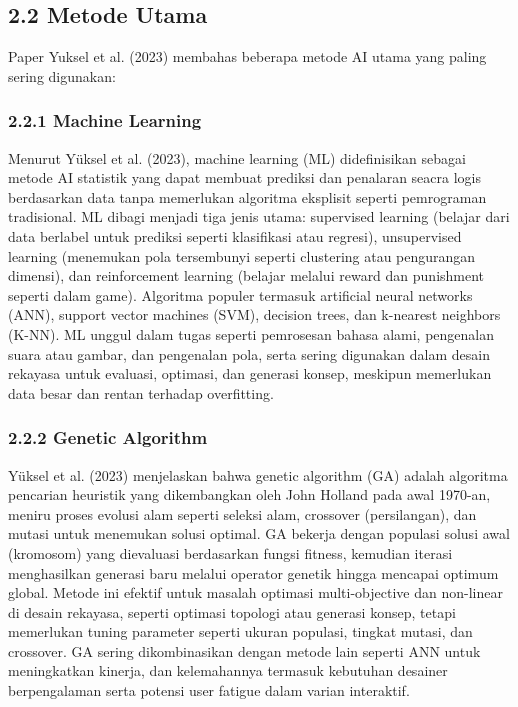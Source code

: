 \documentclass{article}
\begin{document}
\subsection*{2.2 Metode Utama}
Paper Yuksel et al. (2023) membahas beberapa metode AI utama yang paling sering digunakan:
\subsubsection*{2.2.1 Machine Learning}
Menurut Yüksel et al. (2023), machine learning (ML) didefinisikan sebagai metode AI statistik yang dapat membuat prediksi dan penalaran seacra logis berdasarkan data tanpa memerlukan algoritma eksplisit seperti pemrograman tradisional. ML dibagi menjadi tiga jenis utama: supervised learning (belajar dari data berlabel untuk prediksi seperti klasifikasi atau regresi), unsupervised learning (menemukan pola tersembunyi seperti clustering atau pengurangan dimensi), dan reinforcement learning (belajar melalui reward dan punishment seperti dalam game). Algoritma populer termasuk artificial neural networks (ANN), support vector machines (SVM), decision trees, dan k-nearest neighbors (K-NN). ML unggul dalam tugas seperti pemrosesan bahasa alami, pengenalan suara atau gambar, dan pengenalan pola, serta sering digunakan dalam desain rekayasa untuk evaluasi, optimasi, dan generasi konsep, meskipun memerlukan data besar dan rentan terhadap overfitting.

\subsubsection*{2.2.2 Genetic Algorithm}
Yüksel et al. (2023) menjelaskan bahwa genetic algorithm (GA) adalah algoritma pencarian heuristik yang dikembangkan oleh John Holland pada awal 1970-an, meniru proses evolusi alam seperti seleksi alam, crossover (persilangan), dan mutasi untuk menemukan solusi optimal. GA bekerja dengan populasi solusi awal (kromosom) yang dievaluasi berdasarkan fungsi fitness, kemudian iterasi menghasilkan generasi baru melalui operator genetik hingga mencapai optimum global. Metode ini efektif untuk masalah optimasi multi-objective dan non-linear di desain rekayasa, seperti optimasi topologi atau generasi konsep, tetapi memerlukan tuning parameter seperti ukuran populasi, tingkat mutasi, dan crossover. GA sering dikombinasikan dengan metode lain seperti ANN untuk meningkatkan kinerja, dan kelemahannya termasuk kebutuhan desainer berpengalaman serta potensi user fatigue dalam varian interaktif.
\end{document}
